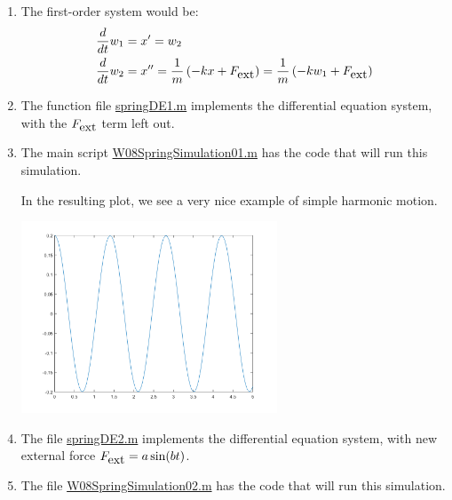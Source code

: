 \begin{enumerate}
\begin{Question}
\begin{enumerate}
\end{enumerate}
  \end{Question}

\begin{Solution}
 \begin{enumerate}
 \item  The first-order system would be:
 \begin{align*}
 \frac{d}{dt} w_1 & = x' = w_2 \\
 \frac{d}{dt} w_2 & = x'' = \frac{1}{m} \left(-kx + F_{\mbox{ext}}\right) = \frac{1}{m} \left(-k w_1  + F_{\mbox{ext}} \right)
 \end{align*}

\item The function file  
  \href{http://www.mast.queensu.ca/~apsc171/MNTCP01/PracticeProblems/MATLAB/springDE1.m}{springDE1.m} 
  implements the differential equation system, with the $F_{\mbox{ext}} $ term
  left out.

\item The main script
\href{http://www.mast.queensu.ca/~apsc171/MNTCP01/PracticeProblems/MATLAB/W08SpringSimulation01.m}{W08SpringSimulation01.m} 
has the code that will run this simulation.

In the resulting plot, we see a very nice example of simple harmonic
motion.

\begin{center}
\includegraphics[width=3in]{graphics/Week08_Spring/W08SpringSimulation01}
\end{center}

\item The file  
  \href{http://www.mast.queensu.ca/~apsc171/MNTCP01/PracticeProblems/MATLAB/springDE2.m}{springDE2.m} 
  implements the differential equation system, with new external force
  $F_{\mbox{ext}} = a \sin(bt)$.
\item The file 
\href{http://www.mast.queensu.ca/~apsc171/MNTCP01/PracticeProblems/MATLAB/W08SpringSimulation02.m}{W08SpringSimulation02.m} 
has the code that will run this simulation.


\end{enumerate}
\end{Solution}
\end{enumerate}
